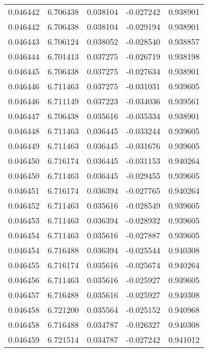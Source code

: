 \begin{tabular}{lrrrr}
0.046442    &  6.706438 &  0.038104 & -0.027242 &             0.938901 \\
0.046442    &  6.706438 &  0.038104 & -0.029194 &             0.938901 \\
0.046443    &  6.706124 &  0.038052 & -0.028540 &             0.938857 \\
0.046444    &  6.701413 &  0.037275 & -0.026719 &             0.938198 \\
0.046445    &  6.706438 &  0.037275 & -0.027634 &             0.938901 \\
0.046446    &  6.711463 &  0.037275 & -0.031031 &             0.939605 \\
0.046446    &  6.711149 &  0.037223 & -0.034036 &             0.939561 \\
0.046447    &  6.706438 &  0.035616 & -0.035334 &             0.938901 \\
0.046448    &  6.711463 &  0.036445 & -0.033244 &             0.939605 \\
0.046449    &  6.711463 &  0.036445 & -0.031676 &             0.939605 \\
0.046450    &  6.716174 &  0.036445 & -0.031153 &             0.940264 \\
0.046450    &  6.711463 &  0.036445 & -0.029455 &             0.939605 \\
0.046451    &  6.716174 &  0.036394 & -0.027765 &             0.940264 \\
0.046452    &  6.711463 &  0.035616 & -0.028549 &             0.939605 \\
0.046453    &  6.711463 &  0.036394 & -0.028932 &             0.939605 \\
0.046454    &  6.711463 &  0.035616 & -0.027887 &             0.939605 \\
0.046454    &  6.716488 &  0.036394 & -0.025544 &             0.940308 \\
0.046455    &  6.716174 &  0.035616 & -0.025674 &             0.940264 \\
0.046456    &  6.711463 &  0.035616 & -0.025927 &             0.939605 \\
0.046457    &  6.716488 &  0.035616 & -0.025927 &             0.940308 \\
0.046458    &  6.721200 &  0.035564 & -0.025152 &             0.940968 \\
0.046458    &  6.716488 &  0.034787 & -0.026327 &             0.940308 \\
0.046459    &  6.721514 &  0.034787 & -0.027242 &             0.941012 \\

\end{tabular}

